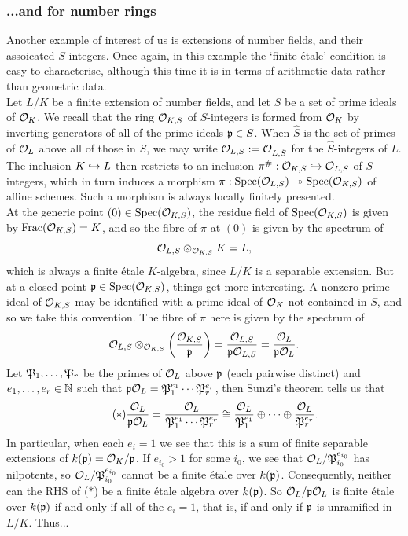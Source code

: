 \subsubsection{...and for number rings}
\label{subsubsec:2_4_5_fet_maps_of_number_rings}
Another example of interest of us is extensions of number fields, and their assoicated $S$-integers. Once again, in this example the `finite \'etale' condition is easy to characterise, although this time it is in terms of arithmetic data rather than geometric data.\\ 

Let $L/K$ be a finite extension of number fields, and let $S$ be a set of prime ideals of $\mathcal{O}_K$. We recall that the ring $\mathcal{O}_{K,S}$ of $S$-integers is formed from $\mathcal{O}_K$ by inverting generators of all of the prime ideals $\mathfrak{p} \in S$. When $\hat{S}$ is the set of primes of $\mathcal{O}_L$ above all of those in $S$, we may write $\mathcal{O}_{L,S} := \mathcal{O}_{L, \hat{S}}$ for the $\hat{S}$-integers of $L$. The inclusion $K \hookrightarrow L$ then restricts to an inclusion $\pi^{\#} : \mathcal{O}_{K, S} \hookrightarrow \mathcal{O}_{L, S}$ of $S$-integers, which in turn induces a morphism $\pi : \mathrm{Spec}(\mathcal{O}_{L, S}) \twoheadrightarrow \mathrm{Spec}(\mathcal{O}_{K,S})$ of affine schemes. Such a morphism is always locally finitely presented.\\

At the generic point $(0) \in \mathrm{Spec}(\mathcal{O}_{K,S})$, the residue field of $\mathrm{Spec}(\mathcal{O}_{K,S})$ is given by $\mathrm{Frac}(\mathcal{O}_{K,S}) = K$, and so the fibre of $\pi$ at $(0)$ is given by the spectrum of
\[
	\mathcal{O}_{L,S} \otimes_{\mathcal{O}_{K,S}} K = L,
\]
which is always a finite \'etale $K$-algebra, since $L/K$ is a separable extension. But at a closed point $\mathfrak{p} \in \mathrm{Spec}(\mathcal{O}_{K,S})$, things get more interesting. A nonzero prime ideal of $\mathcal{O}_{K,S}$ may be identified with a prime ideal of $\mathcal{O}_K$ not contained in $S$, and so we take this convention. The fibre of $\pi$ here is given by the spectrum of
\[
	\mathcal{O}_{L,S} \otimes_{\mathcal{O}_{K,S}} \left(\frac{\mathcal{O}_{K,S}}{\mathfrak{p}}\right) = \frac{\mathcal{O}_{L,S}}{\mathfrak{p}\mathcal{O}_{L,S}} = \frac{\mathcal{O}_L}{\mathfrak{p}\mathcal{O}_L}.
\]
Let $\mathfrak{P}_1,\ldots, \mathfrak{P}_r$ be the primes of $\mathcal{O}_L$ above $\mathfrak{p}$ (each pairwise distinct) and $e_1, \ldots, e_r \in \mathbb{N}$ such that $\mathfrak{p}\mathcal{O}_L = \mathfrak{P}_1^{e_1} \cdots \mathfrak{P}_r^{e_r}$, then Sunzi's theorem tells us that 
\[
	\tag{$\ast$}
	\frac{\mathcal{O}_L}{\mathfrak{p}\mathcal{O}_L} = \frac{\mathcal{O}_L}{\mathfrak{P}_1^{e_1}\cdots\mathfrak{P}_r^{e_r}} \cong \frac{\mathcal{O}_L}{\mathfrak{P}_1^{e_1}} \oplus \cdots \oplus \frac{\mathcal{O}_L}{\mathfrak{P}_r^{e_r}}.
\]
In particular, when each $e_i=1$ we see that this is a sum of finite separable extensions of $k(\mathfrak{p}) = \mathcal{O}_K/\mathfrak{p}$. If $e_{i_0}>1$ for some $i_0$, we see that $\mathcal{O}_L/\mathfrak{P}_{i_0}^{e_{i_0}}$ has nilpotents, so $\mathcal{O}_L/\mathfrak{P}_{i_0}^{e_{i_0}}$ cannot be a finite \'etale over $k(\mathfrak{p})$. Consequently, neither can the RHS of ($\ast$) be a finite \'etale algebra over $k(\mathfrak{p})$. So $\mathcal{O}_L/\mathfrak{p}\mathcal{O}_L$ is finite \'etale over $k(\mathfrak{p})$ if and only if all of the $e_i=1$, that is, if and only if $\mathfrak{p}$ is unramified in $L/K$. Thus...

